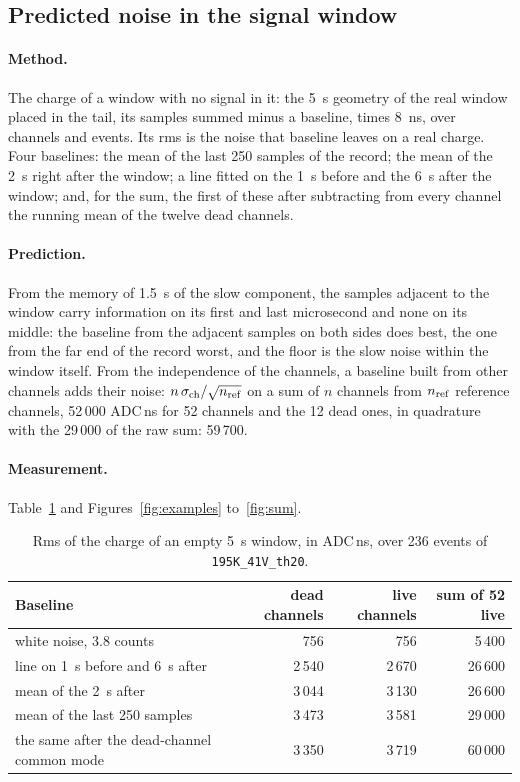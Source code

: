 \documentclass[11pt]{article}
\newcommand{\code}[1]{\texttt{#1}}
\newcommand{\us}{\textmu s\xspace}
\begin{document}
\subsection{Predicted noise in the signal window}

\paragraph{Method.} The charge of a window with no signal in it: the
5~\us geometry of the real window placed in the tail, its samples summed
minus a baseline, times 8~ns, over channels and events. Its rms is the
noise that baseline leaves on a real charge. Four baselines: the mean of
the last 250 samples of the record; the mean of the 2~\us right after
the window; a line fitted on the 1~\us before and the 6~\us after the
window; and, for the sum, the first of these after subtracting from
every channel the running mean of the twelve dead channels.

\paragraph{Prediction.} From the memory of 1.5~\us of the slow
component, the samples adjacent to the window carry information on its
first and last microsecond and none on its middle: the baseline from the
adjacent samples on both sides does best, the one from the far end of the
record worst, and the floor is the slow noise within the window itself.
From the independence of the channels, a baseline built from other
channels adds their noise: $n\,\sigma_{\rm ch}/\sqrt{n_{\rm ref}}$ on a
sum of $n$ channels from $n_{\rm ref}$ reference channels, 52\,000
ADC\,ns for 52 channels and the 12 dead ones, in quadrature with the
29\,000 of the raw sum: 59\,700.

\paragraph{Measurement.} Table~\ref{tab:empty} and
Figures~\ref{fig:examples} to~\ref{fig:sum}.

\begin{table}[h]
\centering
\begin{tabular}{l r r r}
\toprule
Baseline & dead channels & live channels & sum of 52 live \\
\midrule
white noise, 3.8 counts & 756 & 756 & 5\,400 \\
line on 1~\us before and 6~\us after & 2\,540 & 2\,670 & 26\,600 \\
mean of the 2~\us after & 3\,044 & 3\,130 & 26\,600 \\
mean of the last 250 samples & 3\,473 & 3\,581 & 29\,000 \\
the same after the dead-channel common mode & 3\,350 & 3\,719 & 60\,000 \\
\bottomrule
\end{tabular}
\caption{Rms of the charge of an empty 5~\us window, in ADC\,ns, over
236 events of \code{195K\_41V\_th20}.}
\label{tab:empty}
\end{table}
\end{document}
